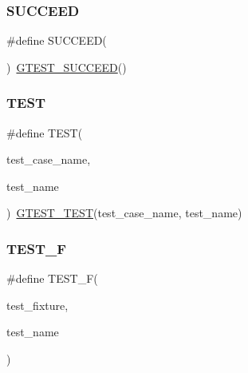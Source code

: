 \subsubsection{\texorpdfstring{SUCCEED}{SUCCEED}}
{\footnotesize\ttfamily \#define S\+U\+C\+C\+E\+ED(\begin{DoxyParamCaption}{ }\end{DoxyParamCaption})~\mbox{\hyperlink{_obj__test_2lib_2googletest-release-1_88_81_2googletest_2include_2gtest_2gtest_8h_a2690441c38202728f4159ac2462d9720}{G\+T\+E\+S\+T\+\_\+\+S\+U\+C\+C\+E\+ED}}()}

\mbox{\label{_obj__test_2lib_2googletest-release-1_88_81_2googletest_2include_2gtest_2gtest_8h_ad8b332753515c0ab8baada563c2547eb}} 
\subsubsection{\texorpdfstring{TEST}{TEST}}
{\footnotesize\ttfamily \#define T\+E\+ST(\begin{DoxyParamCaption}\item[{}]{test\+\_\+case\+\_\+name,  }\item[{}]{test\+\_\+name }\end{DoxyParamCaption})~\mbox{\hyperlink{_obj__test_2lib_2googletest-release-1_88_81_2googletest_2test_2gtest__unittest_8cc_a54247aeadc0617105812dca8609638de}{G\+T\+E\+S\+T\+\_\+\+T\+E\+ST}}(test\+\_\+case\+\_\+name, test\+\_\+name)}

\mbox{\label{_obj__test_2lib_2googletest-release-1_88_81_2googletest_2include_2gtest_2gtest_8h_a0ee66d464d1a06c20c1929cae09d8758}} 
\subsubsection{\texorpdfstring{TEST\_F}{TEST\_F}}
{\footnotesize\ttfamily \#define T\+E\+S\+T\+\_\+F(\begin{DoxyParamCaption}\item[{}]{test\+\_\+fixture,  }\item[{}]{test\+\_\+name }\end{DoxyParamCaption})}

